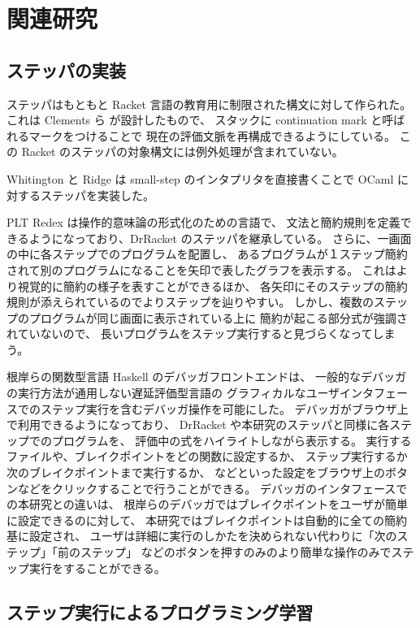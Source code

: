 \chapter{関連研究}
\label{chapter:related}

\section{ステッパの実装}
\label{section:stepper__related}

ステッパはもともと Racket 言語の教育用に制限された構文に対して作られた。
これは Clements ら \cite{clements01} が設計したもので、
スタックに continuation mark と呼ばれるマークをつけることで
現在の評価文脈を再構成できるようにしている。
この Racket のステッパの対象構文には例外処理が含まれていない。

Whitington と Ridge \cite{EPTCS294.3} は
small-step のインタプリタを直接書くことで
OCaml に対するステッパを実装した。

PLT Redex \cite{felleisen09}は操作的意味論の形式化のための言語で、
文法と簡約規則を定義できるようになっており、DrRacket のステッパを継承している。
さらに、一画面の中に各ステップでのプログラムを配置し、
あるプログラムが１ステップ簡約されて別のプログラムになることを矢印で表したグラフを表示する。
これはより視覚的に簡約の様子を表すことができるほか、
各矢印にそのステップの簡約規則が添えられているのでよりステップを辿りやすい。
しかし、複数のステップのプログラムが同じ画面に表示されている上に
簡約が起こる部分式が強調されていないので、
長いプログラムをステップ実行すると見づらくなってしまう。

根岸ら\cite{NI2009}の関数型言語 Haskell のデバッガフロントエンドは、
一般的なデバッガの実行方法が通用しない遅延評価型言語の
グラフィカルなユーザインタフェースでのステップ実行を含むデバッガ操作を可能にした。
デバッガがブラウザ上で利用できるようになっており、
DrRacket や本研究のステッパと同様に各ステップでのプログラムを、
評価中の式をハイライトしながら表示する。
実行するファイルや、ブレイクポイントをどの関数に設定するか、
ステップ実行するか次のブレイクポイントまで実行するか、
などといった設定をブラウザ上のボタンなどをクリックすることで行うことができる。
デバッガのインタフェースでの本研究との違いは、
根岸ら\cite{NI2009}のデバッガではブレイクポイントをユーザが簡単に設定できるのに対して、
本研究ではブレイクポイントは自動的に全ての簡約基に設定され、
ユーザは詳細に実行のしかたを決められない代わりに「次のステップ」「前のステップ」
などのボタンを押すのみのより簡単な操作のみでステップ実行をすることができる。

\section{ステップ実行によるプログラミング学習}

